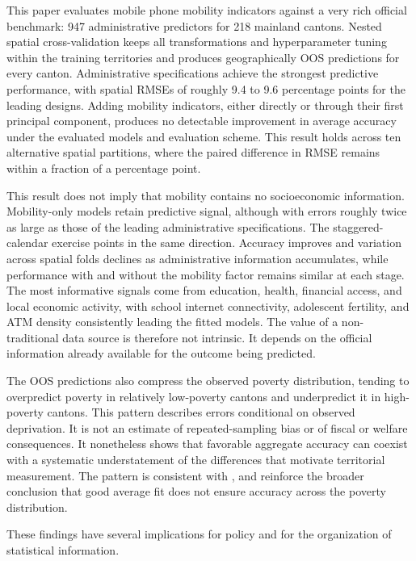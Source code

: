 \documentclass[pdflatex,sn-apa]{sn-jnl}
\begin{document}
This paper evaluates mobile phone mobility indicators against a very rich official benchmark: 947 administrative predictors for 218 mainland cantons. Nested spatial cross-validation keeps all transformations and hyperparameter tuning within the training territories and produces geographically OOS predictions for every canton. Administrative specifications achieve the strongest predictive performance, with spatial RMSEs of roughly 9.4 to 9.6 percentage points for the leading designs. Adding mobility indicators, either directly or through their first principal component, produces no detectable improvement in average accuracy under the evaluated models and evaluation scheme. This result holds across ten alternative spatial partitions, where the paired difference in RMSE remains within a fraction of a percentage point.

This result does not imply that mobility contains no socioeconomic information. Mobility-only models retain predictive signal, although with errors roughly twice as large as those of the leading administrative specifications. The staggered-calendar exercise points in the same direction. Accuracy improves and variation across spatial folds declines as administrative information accumulates, while performance with and without the mobility factor remains similar at each stage. The most informative signals come from education, health, financial access, and local economic activity, with school internet connectivity, adolescent fertility, and ATM density consistently leading the fitted models. The value of a non-traditional data source is therefore not intrinsic. It depends on the official information already available for the outcome being predicted.

The OOS predictions also compress the observed poverty distribution, tending to overpredict poverty in relatively low-poverty cantons and underpredict it in high-poverty cantons. This pattern describes errors conditional on observed deprivation. It is not an estimate of repeated-sampling bias or of fiscal or welfare consequences. It nonetheless shows that favorable aggregate accuracy can coexist with a systematic understatement of the differences that motivate territorial measurement. The pattern is consistent with \citet{Corral2025}, and \citet{CorralRodas2025Aggregation} reinforce the broader conclusion that good average fit does not ensure accuracy across the poverty distribution.

These findings have several implications for policy and for the organization of statistical information.
\end{document}
